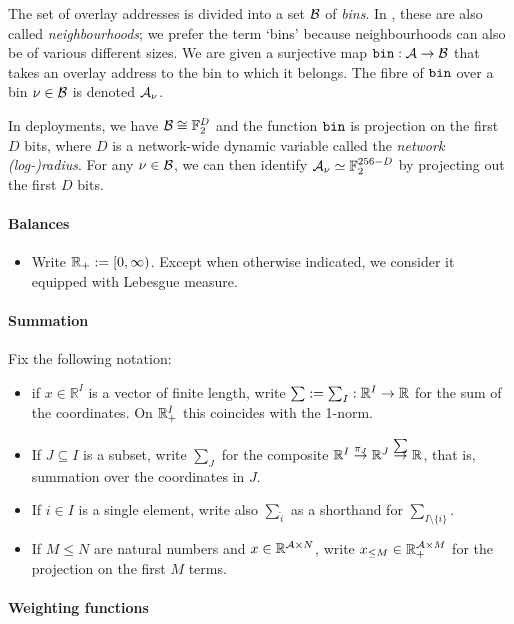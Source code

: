 The set of overlay addresses is divided into a set $\mathcal{B}$ of \emph{bins}.
%
In \cite{book-of-swarm}, these are also called \emph{neighbourhoods}; we prefer the term `bins' because neighbourhoods can also be of various different sizes.
%
We are given a surjective map $\mathtt{bin}:\mathcal{A}\rightarrow\mathcal{B}$ that takes an overlay address to the bin to which it belongs.
%
The fibre of $\mathtt{bin}$ over a bin $\nu\in\mathcal{B}$ is denoted $\mathcal{A}_\nu$.

In deployments, we have $\mathcal{B}\cong \mathbb{F}_2^D$ and the function $\mathtt{bin}$ is projection on the first $D$ bits, where $D$ is a network-wide dynamic variable called the \emph{network (log-)radius}.
%
For any $\nu\in\mathcal{B}$, we can then identify $\mathcal{A}_\nu\simeq\mathbb{F}_2^{256-D}$ by projecting out the first $D$ bits.


\paragraph{Balances}
\begin{itemize}
  \item 
    Write $\mathbb{R}_+ := [0,\infty)$. Except when otherwise indicated, we consider it equipped with Lebesgue measure.

\end{itemize}

\paragraph{Summation}

Fix the following notation:
\begin{itemize}
  \item if $x\in \mathbb{R}^I$ is a vector of finite length, write $\sum:=\sum_I:\mathbb{R}^I\rightarrow\mathbb{R}$ for the sum of the coordinates. On $\mathbb{R}_+^I$ this coincides with the 1-norm.
  \item If $J\subseteq I$ is a subset, write $\sum_J$ for the composite $\mathbb{R}^I\stackrel{\pi_J}{\rightarrow}\mathbb{R}^J\stackrel{\sum}{\rightarrow}\mathbb{R}$, that is, summation over the coordinates in $J$.
  \item If $i\in I$ is a single element, write also $\sum_{\hat{i}}$ as a shorthand for $\sum_{I\setminus\{i\}}$.
  \item If $M\leq N$ are natural numbers and $x\in\mathbb{R}^{\mathcal{A}\times N}$, write $x_{\leq M}\in \mathbb{R}_+^{\mathcal{A}\times M}$ for the projection on the first $M$ terms.
\end{itemize}

\paragraph{Weighting functions}

